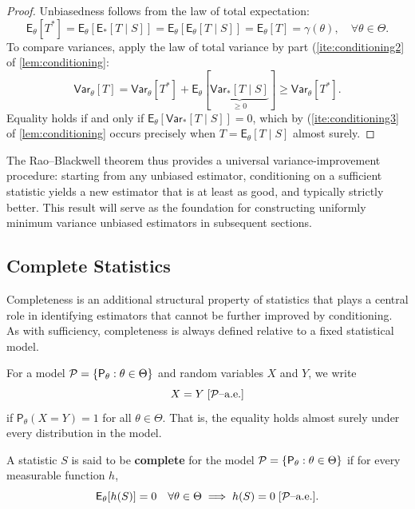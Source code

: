 \begin{proof}
Unbiasedness follows from the law of total expectation:
\[
    \mathsf{E}_{\theta}[T^{*}]
    =
    \mathsf{E}_{\theta}[\mathsf{E}_{*}[T \mid S]]
    =
    \mathsf{E}_{\theta}[\mathsf{E}_{\theta}[T \mid S]]
    =
    \mathsf{E}_{\theta}[T]
    =
    \gamma(\theta),
    \quad
    \forall \theta \in \Theta.
\]
To compare variances, apply the law of total variance by part (\ref{ite:conditioning2} of
\autoref{lem:conditioning}:
\[
    \mathsf{Var}_{\theta}[T]
    =
    \mathsf{Var}_{\theta}[T^{*}]
    +
    \mathsf{E}_{\theta}\![
        \underbrace{\mathsf{Var}_{*}[T \mid S]}_{\ge 0}
    ]
    \ge
    \mathsf{Var}_{\theta}[T^{*}].
\]
Equality holds if and only if
\(\mathsf{E}_{\theta}[\mathsf{Var}_{*}[T \mid S]] = 0\),
which by (\ref{ite:conditioning3} of \autoref{lem:conditioning} occurs precisely when
\(T = \mathsf{E}_{\theta}[T \mid S]\) almost surely.
\end{proof}

\medskip

The Rao--Blackwell theorem thus provides a universal variance-improvement
procedure: starting from any unbiased estimator, conditioning on a sufficient
statistic yields a new estimator that is at least as good, and typically strictly
better.
This result will serve as the foundation for constructing uniformly minimum
variance unbiased estimators in subsequent sections.

\subsection{Complete Statistics}%
\label{sub:cs}

Completeness is an additional structural property of statistics that plays a
central role in identifying estimators that cannot be further improved by
conditioning.
As with sufficiency, completeness is always defined relative to a fixed
statistical model.

\medskip

\begin{notation}[]
For a model \(\mathcal{P}=\{\mathsf{P}_{\theta} : \theta \in \Theta\}\) and random
variables \(X\) and \(Y\), we write
\[
    X = Y \;[\mathcal{P}\text{--a.e.}]
\]
if
\(
\mathsf{P}_{\theta}(X=Y)=1
\)
for all \(\theta \in \Theta\).
That is, the equality holds almost surely under every distribution in the model.
\end{notation}

\medskip

\begin{definition}
A statistic \(S\) is said to be \textbf{complete} for the model
\(\mathcal{P}=\{\mathsf{P}_{\theta} : \theta \in \Theta\}\) if for every measurable
function \(h\),
\[
    \mathsf{E}_{\theta}[h(S)] = 0
    \quad
    \forall \theta \in \Theta
    \;\Longrightarrow\;
    h(S) = 0 \;[\mathcal{P}\text{--a.e.}].
\]
\end{definition}

